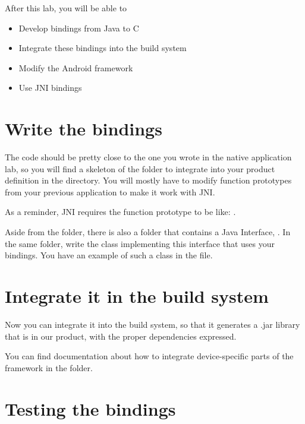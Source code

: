 
After this lab, you will be able to
\begin{itemize}
  \item Develop bindings from Java to C
  \item Integrate these bindings into the build system
  \item Modify the Android framework
  \item Use JNI bindings
\end{itemize}

\section{Write the bindings}

The code should be pretty close to the one you wrote in the native
application lab, so you will find a skeleton of the folder to
integrate into your product definition in the
 directory. You will
mostly have to modify function prototypes from your previous
application to make it work with JNI.

As a reminder, JNI requires the function prototype to be like:
.

Aside from the  folder, there is also a  folder that
contains a Java Interface, . In the same folder,
write the  class implementing this interface that uses your
bindings. You have an example of such a class in the 
file.

\section{Integrate it in the build system}

Now you can integrate it into the build system, so that it generates a .jar
library that is in our product, with the proper dependencies expressed.

You can find documentation about how to integrate device-specific parts of the
framework in the  folder.

\section{Testing the bindings}

